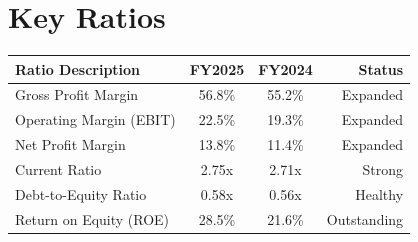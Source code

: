 \section*{Key Ratios}
\noindent
\begin{tabularx}{\textwidth}{L c c r}
  \textbf{Ratio Description} & \textbf{FY2025} & \textbf{FY2024} & \textbf{Status} \\
  \midrule
  Gross Profit Margin & 56.8\% & 55.2\% & Expanded \\
  Operating Margin (EBIT) & 22.5\% & 19.3\% & Expanded \\
  Net Profit Margin & 13.8\% & 11.4\% & Expanded \\
  Current Ratio & 2.75x & 2.71x & Strong \\
  Debt-to-Equity Ratio & 0.58x & 0.56x & Healthy \\
  Return on Equity (ROE) & 28.5\% & 21.6\% & Outstanding \\
  \bottomrule
\end{tabularx}

\clearpage
